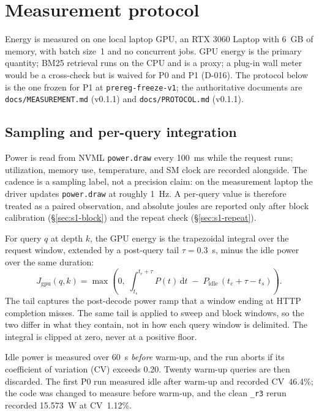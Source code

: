 \section{Measurement protocol}\label{sec:s1}

Energy is measured on one local laptop GPU, an RTX 3060 Laptop with 6~GB of memory, with batch
size~1 and no concurrent jobs. GPU energy is the primary quantity; BM25 retrieval runs on the
CPU and is a proxy; a plug-in wall meter would be a cross-check but is waived for P0 and P1
(D-016). The protocol below is the one frozen for P1 at \texttt{prereg-freeze-v1}; the
authoritative documents are \texttt{docs/MEASUREMENT.md} (v0.1.1) and \texttt{docs/PROTOCOL.md}
(v0.1.1).

\subsection{Sampling and per-query integration}

Power is read from NVML \texttt{power.draw} every 100~ms while the request runs; utilization,
memory use, temperature, and SM clock are recorded alongside. The cadence is a sampling label,
not a precision claim: on the measurement laptop the driver updates \texttt{power.draw} at
roughly 1~Hz. A per-query value is therefore treated as a paired observation, and absolute
joules are reported only after block calibration (\S\ref{sec:s1-block}) and the repeat check
(\S\ref{sec:s1-repeat}).

For query $q$ at depth $k$, the GPU energy is the trapezoidal integral over the request window,
extended by a post-query tail $\tau=0.3$~s, minus the idle power over the same duration:
\begin{equation}
J_{\mathrm{gpu}}(q,k)=\max\!\left(0,\;
\int_{t_s}^{t_e+\tau} P(t)\,\mathrm{d}t
\;-\;P_{\mathrm{idle}}\,(t_e+\tau-t_s)\right).
\label{eq:window}
\end{equation}
The tail captures the post-decode power ramp that a window ending at HTTP completion misses.
The same tail is applied to sweep and block windows, so the two differ in what they contain, not
in how each query window is delimited. The integral is clipped at zero, never at a positive
floor.

Idle power is measured over 60~s \emph{before} warm-up, and the run aborts if its coefficient
of variation (CV) exceeds 0.20. Twenty warm-up queries are then discarded. The first P0 run
measured idle after warm-up and recorded CV~46.4\%; the code was changed to measure before
warm-up, and the clean \texttt{\_r3} rerun recorded 15.573~W at CV~1.12\%.

